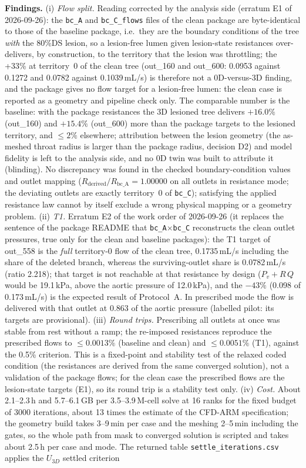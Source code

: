 \documentclass[11pt]{article}
\begin{document}
\textbf{Findings.} (i) \emph{Flow split.} Reading corrected by the analysis side (erratum E1 of 2026-09-26): the \texttt{bc\_A} and \texttt{bc\_C\_flows} files of the clean package are byte-identical to those of the baseline package, i.e.\ they are the boundary conditions of the tree \emph{with} the 80\%DS lesion, so a lesion-free lumen given lesion-state resistances over-delivers, by construction, to the territory that the lesion was throttling; the +33\% at territory~0 of the clean tree (out\_160 and out\_600: 0.0953 against 0.1272 and 0.0782 against 0.1039\,mL/s) is therefore not a 0D-versus-3D finding, and the package gives no flow target for a lesion-free lumen: the clean case is reported as a geometry and pipeline check only. The comparable number is the baseline: with the package resistances the 3D lesioned tree delivers $+16.0\%$ (out\_160) and $+15.4\%$ (out\_600) more than the package targets to the lesioned territory, and $\leq2\%$ elsewhere; attribution between the lesion geometry (the as-meshed throat radius is larger than the package radius, decision D2) and model fidelity is left to the analysis side, and no 0D twin was built to attribute it (blinding). No discrepancy was found in the checked boundary-condition values and outlet mapping ($R_\text{derived}/R_{\text{bc\_A}}=1.00000$ on all outlets in resistance mode; the deviating outlets are exactly territory~0 of \texttt{bc\_C}); satisfying the applied resistance law cannot by itself exclude a wrong physical mapping or a geometry problem. (ii) \emph{T1.} Erratum E2 of the work order of 2026-09-26 (it replaces the sentence of the package README that \texttt{bc\_A}$\times$\texttt{bc\_C} reconstructs the clean outlet pressures, true only for the clean and baseline packages): the T1 target of out\_558 is the \emph{full} territory-0 flow of the clean tree, 0.1735\,mL/s including the share of the deleted branch, whereas the surviving-outlet share is 0.0782\,mL/s (ratio 2.218); that target is not reachable at that resistance by design ($P_v+R\,Q$ would be 19.1\,kPa, above the aortic pressure of 12.0\,kPa), and the $-43\%$ (0.098 of 0.173\,mL/s) is the expected result of Protocol~A. In prescribed mode the flow is delivered with that outlet at 0.863 of the aortic pressure (labelled pilot: its targets are provisional). (iii) \emph{Round trips.} Prescribing all outlets at once was stable from rest without a ramp; the re-imposed resistances reproduce the prescribed flows to $\leq0.0013\%$ (baseline and clean) and $\leq0.0051\%$ (T1), against the 0.5\% criterion. This is a fixed-point and stability test of the relaxed coded condition (the resistances are derived from the same converged solution), not a validation of the package flows; for the clean case the prescribed flows are the lesion-state targets (E1), so its round trip is a stability test only. (iv) \emph{Cost.} About 2.1--2.3\,h and 5.7--6.1\,GB per 3.5--3.9\,M-cell solve at 16 ranks for the fixed budget of 3000 iterations, about 13 times the estimate of the CFD-ARM specification; the geometry build takes 3--9\,min per case and the meshing 2--5\,min including the gates, so the whole path from mask to converged solution is scripted and takes about 2.5\,h per case and mode. The returned table \texttt{settle\_iterations.csv} applies the $U_{3D}$ settled criterion 
\end{document}

